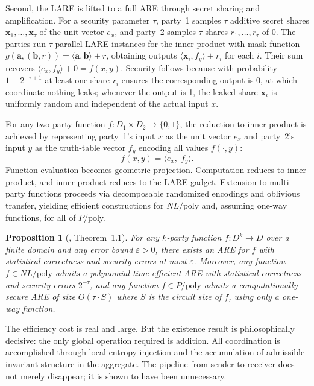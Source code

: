 \documentclass[12pt, a4paper]{article}
\theoremstyle{essaystyle}
\newtheorem{proposition}{Proposition}
\begin{document}
Second, the LARE is lifted to a full ARE through secret sharing and amplification.
For a security parameter $\tau$, party~1 samples $\tau$ additive secret shares
$\mathbf{x}_1, \ldots, \mathbf{x}_\tau$ of the unit vector $e_x$, and party~2
samples $\tau$ shares $r_1, \ldots, r_\tau$ of $0$. The parties run $\tau$ parallel
LARE instances for the inner-product-with-mask function
$g(\mathbf{a}, (\mathbf{b}, r)) = \langle \mathbf{a}, \mathbf{b}\rangle + r$,
obtaining outputs $\langle \mathbf{x}_i, f_y\rangle + r_i$ for each $i$. Their sum
recovers $\langle e_x, f_y\rangle + 0 = f(x,y)$. Security follows because with
probability $1 - 2^{-\tau+1}$ at least one share $r_i$ ensures the corresponding
output is 0, at which coordinate nothing leaks; whenever the output is 1, the leaked
share $\mathbf{x}_i$ is uniformly random and independent of the actual input $x$.

For any two-party function $f : D_1 \times D_2 \to \{0,1\}$, the reduction to inner
product is achieved by representing party~1's input $x$ as the unit vector $e_x$ and
party~2's input $y$ as the truth-table vector $f_y$ encoding all values $f(\cdot, y)$:
\[
f(x, y) = \langle e_x,\; f_y \rangle.
\]
Function evaluation becomes geometric projection. Computation reduces to inner product,
and inner product reduces to the LARE gadget. Extension to multi-party functions
proceeds via decomposable randomized encodings and oblivious transfer, yielding
efficient constructions for $NL/\mathrm{poly}$ and, assuming one-way functions,
for all of $P/\mathrm{poly}$.

\begin{proposition}[\citealt{shufflinguniversal}, Theorem~1.1]
For any $k$-party function $f : D^k \to D$ over a finite domain and any error bound
$\varepsilon > 0$, there exists an ARE for $f$ with statistical correctness and
security errors at most $\varepsilon$. Moreover, any function $f \in NL/\mathrm{poly}$
admits a polynomial-time efficient ARE with statistical correctness and security errors
$2^{-\tau}$, and any function $f \in P/\mathrm{poly}$ admits a computationally secure
ARE of size $O(\tau \cdot S)$ where $S$ is the circuit size of $f$, using only a
one-way function.
\end{proposition}

The efficiency cost is real and large. But the existence result is philosophically
decisive: the only global operation required is addition. All coordination is
accomplished through local entropy injection and the accumulation of admissible
invariant structure in the aggregate. The pipeline from sender to receiver does not
merely disappear; it is shown to have been unnecessary.
\end{document}
